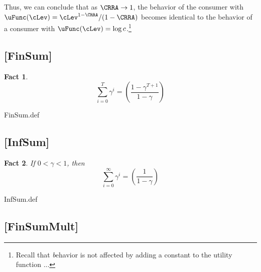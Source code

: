 \documentclass{handout}
\newtheorem{Fact}{Fact}
\providecommand{\currentpdfbookmark}{}
\begin{document}
Thus, we can conclude that as $\CRRA \rightarrow 1$, the behavior of
the consumer with $\uFunc(\cLev)=\cLev^{1-\CRRA}/(1-\CRRA)$ becomes identical to
the behavior of a consumer with $\uFunc(\cLev)=\log c$.\footnote{Recall that {\textit behavior} is not affected by adding a constant to the utility function ...}


\hypertarget{FinSum}{}
\subsection{[FinSum]}\label{fact:FinSum} 


\begin{Fact} 
\begin{equation}
\displaystyle \sum_{i=0}^{T} \gamma^{i} = \left(\frac{1-\gamma^{T+1}}{1-\gamma}\right)
\end{equation} 
\end{Fact}

\begin{verbatimwrite}{FinSum.def}
\providecommand{\FinSum}{\href{http://www.econ2.jhu.edu/people/ccarroll/public/LectureNotes/MathFacts/MathFactsList\#FinSum}{\ensuremath{\mathtt{[FinSum]}}}}
\end{verbatimwrite}


\hypertarget{InfSum}{}

\subsection{[InfSum]}\label{fact:InfSum}


\begin{Fact} If $0 < \gamma < 1$, then 
\begin{equation}
\displaystyle \sum_{i=0}^{\infty} \gamma^{i} = \left(\frac{1}{1-\gamma}\right)
\end{equation}
\end{Fact}

\begin{verbatimwrite}{InfSum.def}
\providecommand{\InfSum}{\href{http://www.econ2.jhu.edu/people/ccarroll/public/LectureNotes/MathFacts/MathFactsList\#InfSum}{\ensuremath{\mathtt{[InfSum]}}}}
\end{verbatimwrite}

\hypertarget{FinSumMult}{}
\subsection{[FinSumMult]}\label{fact:FinSumMult} 
\end{document}
